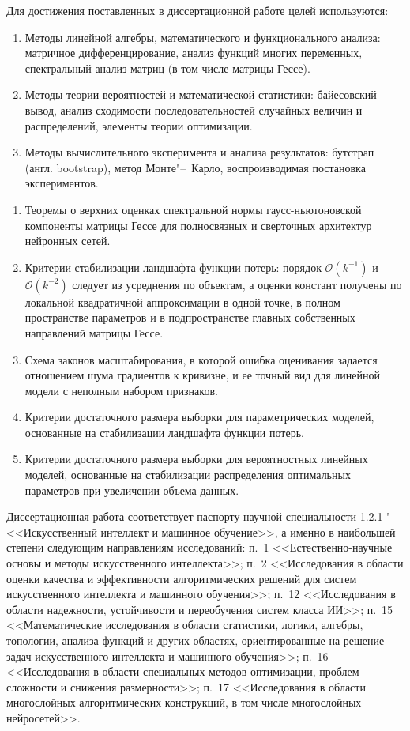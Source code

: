 {\methods} Для достижения поставленных
в диссертационной работе целей используются:
\begin{enumerate}[beginpenalty=10000]
    \item Методы линейной алгебры, математического и функционального анализа: матричное дифференцирование, анализ функций многих переменных, спектральный анализ матриц (в том числе матрицы Гессе).
    \item Методы теории вероятностей и математической статистики: байесовский вывод, анализ сходимости последовательностей случайных величин и распределений, элементы теории оптимизации.
    \item Методы вычислительного эксперимента и анализа результатов: бутстрап (англ. bootstrap), метод Монте"--~Карло, воспроизводимая постановка экспериментов.
\end{enumerate}

{}
\begin{enumerate}[beginpenalty=10000]
    \item Теоремы о верхних оценках спектральной нормы гаусс-ньютоновской компоненты матрицы Гессе для полносвязных и сверточных архитектур нейронных сетей.
    \item Критерии стабилизации ландшафта функции потерь: порядок $\mathcal O(k^{-1})$ и $\mathcal O(k^{-2})$ следует из усреднения по объектам, а оценки констант получены по локальной квадратичной аппроксимации в одной точке, в полном пространстве параметров и в подпространстве главных собственных направлений матрицы Гессе.
    \item Схема законов масштабирования, в которой ошибка оценивания задается отношением шума градиентов к кривизне, и ее точный вид для линейной модели с неполным набором признаков.
    \item Критерии достаточного размера выборки для параметрических моделей, основанные на стабилизации ландшафта функции потерь.
    \item Критерии достаточного размера выборки для вероятностных линейных моделей, основанные на стабилизации распределения оптимальных параметров при увеличении объема данных.
\end{enumerate}

{\passport} Диссертационная работа соответствует паспорту научной специальности 1.2.1 "--- <<Искусственный интеллект и машинное обучение>>, а именно в наибольшей степени следующим направлениям исследований: п.~1 <<Естественно-научные основы и методы искусственного интеллекта>>; п.~2 <<Исследования в области оценки качества и эффективности алгоритмических решений для систем искусственного интеллекта и машинного обучения>>; п.~12 <<Исследования в области надежности, устойчивости и переобучения систем класса ИИ>>; п.~15 <<Математические исследования в области статистики, логики, алгебры, топологии, анализа функций и других областях, ориентированные на решение задач искусственного интеллекта и машинного обучения>>; п.~16 <<Исследования в области специальных методов оптимизации, проблем сложности и снижения размерности>>; п.~17 <<Исследования в области многослойных алгоритмических конструкций, в том числе многослойных нейросетей>>.


